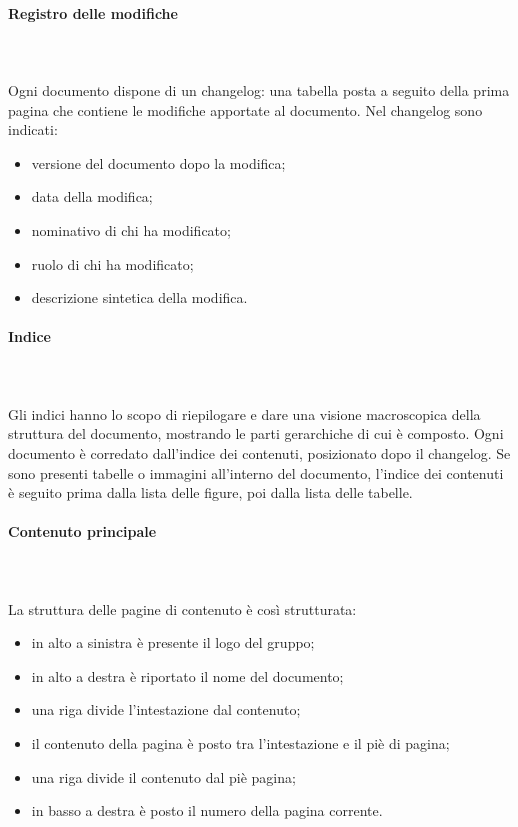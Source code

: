 		\paragraph{Registro delle modifiche} \mbox{}\\ \mbox{}\\
		Ogni documento dispone di un changelog\glo: una tabella posta a seguito della prima pagina che contiene le modifiche apportate al documento. Nel changelog sono indicati:
		\begin{itemize}
			\item versione del documento dopo la modifica;
			\item data della modifica;
			\item nominativo di chi ha modificato;
			\item ruolo di chi ha modificato;
			\item descrizione sintetica della modifica.
		\end{itemize}
		\paragraph{Indice} \mbox{}\\ \mbox{}\\
		Gli indici hanno lo scopo di riepilogare e dare una visione macroscopica della struttura del documento, mostrando le parti gerarchiche di cui è composto.\newline 
		Ogni documento è corredato dall'indice dei contenuti, posizionato dopo il changelog\glo. Se sono presenti tabelle o immagini all'interno del documento, l'indice dei contenuti è seguito prima dalla lista delle figure, poi dalla lista delle tabelle.
		\paragraph{Contenuto principale} \mbox{}\\ \mbox{}\\
		La struttura delle pagine di contenuto è così strutturata:
		\begin{itemize}
			\item in alto a sinistra è presente il logo del gruppo;
			\item in alto a destra è riportato il nome del documento;
			\item una riga divide l'intestazione dal contenuto;
			\item il contenuto della pagina è posto tra l'intestazione e il piè di pagina;
			\item una riga divide il contenuto dal piè pagina;
			\item in basso a destra è posto il numero della pagina corrente.
		\end{itemize}
